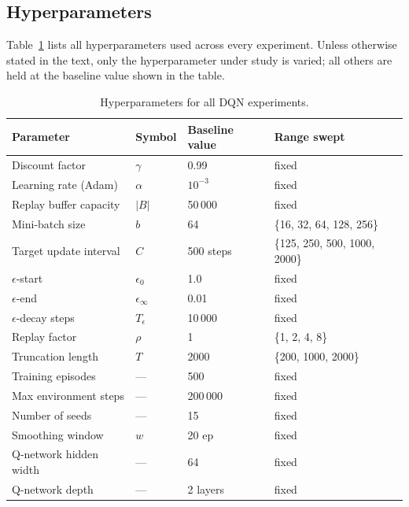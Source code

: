 \documentclass[11pt,a4paper]{article}
\begin{document}
\begin{appendices}

\section{Hyperparameters}
\label{app:hparams}

Table~\ref{tab:hparams} lists all hyperparameters used across every experiment.
Unless otherwise stated in the text, only the hyperparameter under study is
varied; all others are held at the baseline value shown in the table.

\begin{table}[H]
\centering
\caption{Hyperparameters for all DQN experiments.}
\label{tab:hparams}
\renewcommand{\arraystretch}{1.25}
\begin{tabular}{llll}
\toprule
\textbf{Parameter} & \textbf{Symbol} & \textbf{Baseline value} & \textbf{Range swept} \\
\midrule
Discount factor            & \(\gamma\)            & 0.99   & fixed \\
Learning rate (Adam)       & \(\alpha\)            & \(10^{-3}\) & fixed \\
Replay buffer capacity     & \(|B|\)               & 50\,000  & fixed \\
Mini-batch size            & \(b\)                 & 64     & \{16, 32, 64, 128, 256\} \\
Target update interval     & \(C\)                 & 500 steps & \{125, 250, 500, 1000, 2000\} \\
\(\epsilon\)-start         & \(\epsilon_0\)        & 1.0    & fixed \\
\(\epsilon\)-end           & \(\epsilon_\infty\)   & 0.01   & fixed \\
\(\epsilon\)-decay steps   & \(T_\epsilon\)        & 10\,000 & fixed \\
Replay factor              & \(\rho\)              & 1      & \{1, 2, 4, 8\} \\
Truncation length          & \(T\)                 & 2000   & \{200, 1000, 2000\} \\
Training episodes          & ---                   & 500    & fixed \\
Max environment steps      & ---                   & 200\,000 & fixed \\
Number of seeds            & ---                   & 15     & fixed \\
Smoothing window           & \(w\)                 & 20 ep  & fixed \\
Q-network hidden width     & ---                   & 64     & fixed \\
Q-network depth            & ---                   & 2 layers & fixed \\
\bottomrule
\end{tabular}
\end{table}


\end{appendices}
\end{document}
